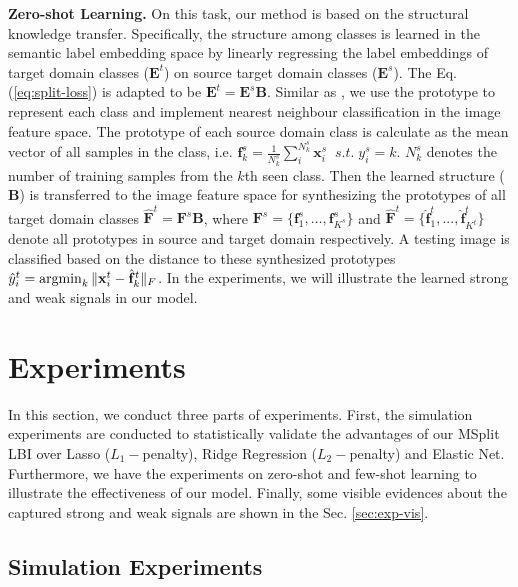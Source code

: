 \documentclass{article}
\begin{document}
\noindent \textbf{Zero-shot Learning.} On this task, our method is
based on the structural knowledge transfer. Specifically, the structure
among classes is learned in the semantic label embedding space by
linearly regressing the label embeddings of target domain classes
($\mathbf{E}^{t}$) on source target domain classes ($\mathbf{E}^{s}$).
The Eq. (\ref{eq:split-loss}) is adapted to be $\mathbf{E}^{t}=\mathbf{E}^{s}\mathbf{B}$.
Similar as \citet{snell2017prototypical} , we use the prototype to
represent each class and implement nearest neighbour classification
in the image feature space. The prototype of each source domain class
is calculate as the mean vector of all samples in the class, i.e.
$\mathbf{f}_{k}^{s}=\frac{1}{N^s_k}\sum_{i}^{N^s_k}{\mathbf{x}_{i}^{s}}\;\;s.t.\;y_{i}^{s}=k$.
${N^s_k}$ denotes the number of training samples from the $k$th seen class.
Then the learned structure ($\mathbf{B}$) is transferred to the image
feature space for synthesizing the prototypes of all target domain
classes $\hat{\mathbf{F}}^{t}=\mathbf{F}^{s}\mathbf{B}$, where $\mathbf{F}^{s}=\{\mathbf{f}_{1}^{s},...,\mathbf{f}_{K^{s}}^{s}\}$
and $\hat{\mathbf{F}}^{t}=\{\hat{\mathbf{f}}_{1}^{t},...,\hat{\mathbf{f}}_{K^{t}}^{t}\}$
denote all prototypes in {source and target domain} respectively.
A testing image is classified based on the distance to these synthesized
prototypes $\hat{y}_{i}^{t}=\operatorname*{argmin}_{k}{\|\mathbf{x}_{i}^{t}-\hat{\mathbf{f}}_{k}^{t}\|_{F}}$.
In the experiments, we will illustrate the learned strong
and weak signals in our model.


\section{Experiments}


In this section, we conduct three parts of experiments. First, the simulation
experiments are conducted to statistically validate the advantages of our
MSplit LBI over Lasso ($L_{1}-$penalty), Ridge Regression ($L_{2}-$penalty)
and Elastic Net. Furthermore, we have the experiments on zero-shot
and few-shot learning to illustrate the effectiveness of our model.
Finally, some visible evidences about the captured strong and weak
signals are shown in the Sec. \ref{sec:exp-vis}.




\subsection{Simulation Experiments}
\end{document}
